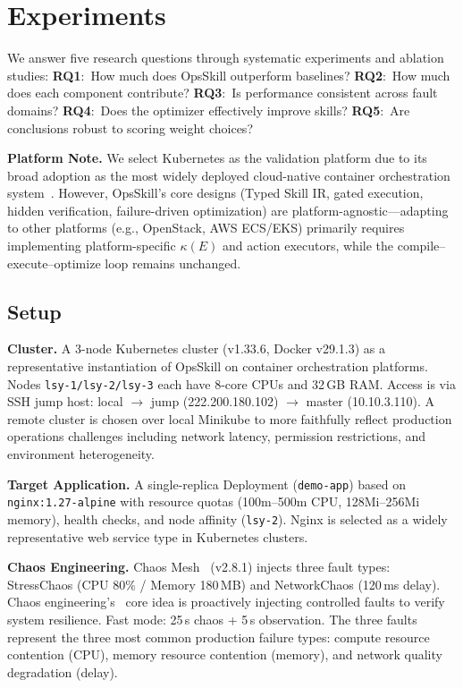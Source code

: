 \documentclass[conference,10pt]{IEEEtran}
\begin{document}
\section{Experiments}

We answer five research questions through systematic experiments and ablation studies:
\textbf{RQ1}:~How much does OpsSkill outperform baselines?
\textbf{RQ2}:~How much does each component contribute?
\textbf{RQ3}:~Is performance consistent across fault domains?
\textbf{RQ4}:~Does the optimizer effectively improve skills?
\textbf{RQ5}:~Are conclusions robust to scoring weight choices?

\noindent\textbf{Platform Note.}
We select Kubernetes as the validation platform due to its broad adoption as the most widely deployed cloud-native container orchestration system~\cite{burns2022kubernetes}.
However, OpsSkill's core designs (Typed Skill IR, gated execution, hidden verification, failure-driven optimization) are platform-agnostic---adapting to other platforms (e.g., OpenStack, AWS ECS/EKS) primarily requires implementing platform-specific $\kappa(E)$ and action executors, while the compile--execute--optimize loop remains unchanged.

\subsection{Setup}

\textbf{Cluster.}
A 3-node Kubernetes cluster (v1.33.6, Docker v29.1.3) as a representative instantiation of OpsSkill on container orchestration platforms.
Nodes \texttt{lsy-1/lsy-2/lsy-3} each have 8-core CPUs and 32\,GB RAM.
Access is via SSH jump host: local $\to$ jump (222.200.180.102) $\to$ master (10.10.3.110).
A remote cluster is chosen over local Minikube to more faithfully reflect production operations challenges including network latency, permission restrictions, and environment heterogeneity.

\textbf{Target Application.}
A single-replica Deployment (\texttt{demo-app}) based on \texttt{nginx:1.27-alpine} with resource quotas (100m--500m CPU, 128Mi--256Mi memory), health checks, and node affinity (\texttt{lsy-2}).
Nginx is selected as a widely representative web service type in Kubernetes clusters.

\textbf{Chaos Engineering.}
Chaos Mesh~\cite{chaosmesh2021} (v2.8.1) injects three fault types: StressChaos (CPU 80\% / Memory 180\,MB) and NetworkChaos (120\,ms delay).
Chaos engineering's~\cite{basiri2016chaos} core idea is proactively injecting controlled faults to verify system resilience.
Fast mode: 25\,s chaos + 5\,s observation.
The three faults represent the three most common production failure types: compute resource contention (CPU), memory resource contention (memory), and network quality degradation (delay).
\end{document}
